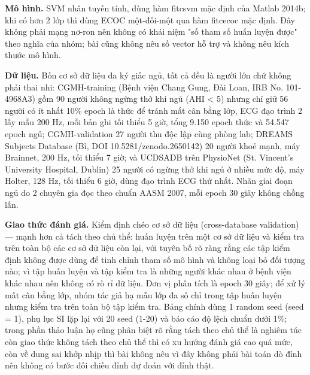 \documentclass[12pt,a4paper]{article}
\begin{document}
\noindent \textbf{Mô hình.} SVM nhân tuyến tính, dùng hàm fitcsvm mặc định của Matlab 2014b; khi có hơn 2 lớp thì dùng ECOC một-đối-một qua hàm fitcecoc mặc định. Đây không phải mạng nơ-ron nên không có khái niệm "số tham số huấn luyện được" theo nghĩa của nhóm; bài cũng không nêu số vector hỗ trợ và không nêu kích thước mô hình.\par\vspace{3pt}
\noindent \textbf{Dữ liệu.} Bốn cơ sở dữ liệu đa ký giấc ngủ, tất cả đều là người lớn chứ không phải thai nhi: CGMH-training (Bệnh viện Chang Gung, Đài Loan, IRB No. 101-4968A3) gồm 90 người không ngừng thở khi ngủ (AHI < 5) nhưng chỉ giữ 56 người có ít nhất 10\% epoch là thức để tránh mất cân bằng lớp, ECG đạo trình 2 lấy mẫu 200 Hz, mỗi bản ghi tối thiểu 5 giờ, tổng 9.150 epoch thức và 54.547 epoch ngủ; CGMH-validation 27 người thu độc lập cùng phòng lab; DREAMS Subjects Database (Bỉ, DOI 10.5281/zenodo.2650142) 20 người khoẻ mạnh, máy Brainnet, 200 Hz, tối thiểu 7 giờ; và UCDSADB trên PhysioNet (St. Vincent's University Hospital, Dublin) 25 người có ngừng thở khi ngủ ở nhiều mức độ, máy Holter, 128 Hz, tối thiểu 6 giờ, dùng đạo trình ECG thứ nhất. Nhãn giai đoạn ngủ do 2 chuyên gia đọc theo chuẩn AASM 2007, mỗi epoch 30 giây không chồng lấn.\par\vspace{3pt}
\noindent \textbf{Giao thức đánh giá.} Kiểm định chéo cơ sở dữ liệu (cross-database validation) — mạnh hơn cả tách theo chủ thể: huấn luyện trên một cơ sở dữ liệu và kiểm tra trên toàn bộ các cơ sở dữ liệu còn lại, với tuyên bố rõ ràng rằng các tập kiểm định không được dùng để tinh chỉnh tham số mô hình và không loại bỏ đối tượng nào; vì tập huấn luyện và tập kiểm tra là những người khác nhau ở bệnh viện khác nhau nên không có rò rỉ dữ liệu. Đơn vị phân tích là epoch 30 giây; để xử lý mất cân bằng lớp, nhóm tác giả hạ mẫu lớp đa số chỉ trong tập huấn luyện nhưng kiểm tra trên toàn bộ tập kiểm tra. Bảng chính dùng 1 random seed (seed = 1), phụ lục SI lặp lại với 20 seed (1-20) và báo cáo độ lệch chuẩn dưới 1\%; trong phần thảo luận họ cũng phân biệt rõ rằng tách theo chủ thể là nghiêm túc còn giao thức không tách theo chủ thể thì có xu hướng đánh giá cao quá mức, còn về dung sai khớp nhịp thì bài không nêu vì đây không phải bài toán dò đỉnh nên không có bước đối chiếu đỉnh dự đoán với đỉnh thật.\par\vspace{3pt}
\end{document}
